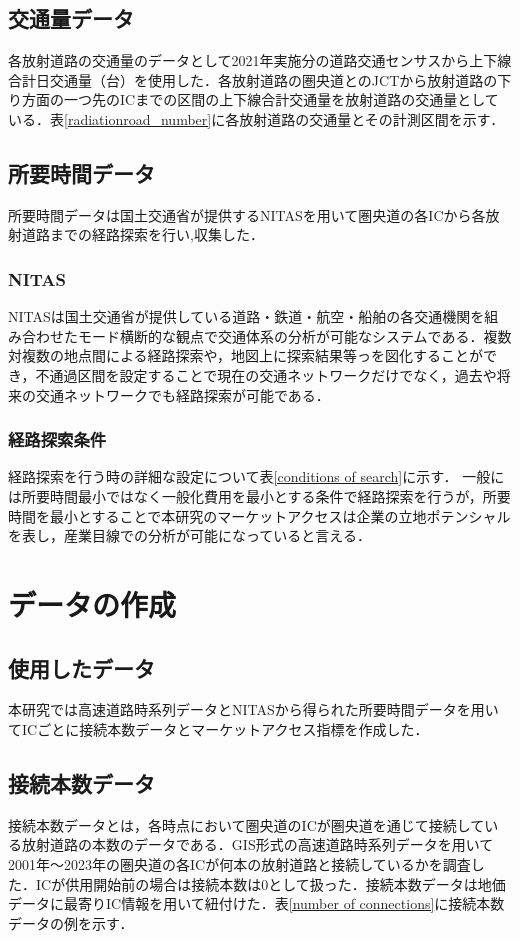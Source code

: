 \subsection{交通量データ}
各放射道路の交通量のデータとして2021年実施分の道路交通センサスから上下線合計日交通量（台）を使用した．各放射道路の圏央道とのJCTから放射道路の下り方面の一つ先のICまでの区間の上下線合計交通量を放射道路の交通量としている．表\ref{radiationroad_number}に各放射道路の交通量とその計測区間を示す．


\subsection{所要時間データ}
所要時間データは国土交通省が提供するNITASを用いて圏央道の各ICから各放射道路までの経路探索を行い,収集した．

\subsubsection{NITAS}
NITASは国土交通省が提供している道路・鉄道・航空・船舶の各交通機関を組み合わせたモード横断的な観点で交通体系の分析が可能なシステムである．複数対複数の地点間による経路探索や，地図上に探索結果等っを図化することができ，不通過区間を設定することで現在の交通ネットワークだけでなく，過去や将来の交通ネットワークでも経路探索が可能である．\cite{NITAS}

\subsubsection{経路探索条件}
経路探索を行う時の詳細な設定について表\ref{conditions of search}に示す．
一般には所要時間最小ではなく一般化費用を最小とする条件で経路探索を行うが，所要時間を最小とすることで本研究のマーケットアクセスは企業の立地ポテンシャルを表し，産業目線での分析が可能になっていると言える．


\section{データの作成}
\subsection{使用したデータ}
本研究では高速道路時系列データとNITASから得られた所要時間データを用いてICごとに接続本数データとマーケットアクセス指標を作成した．

\subsection{接続本数データ}
接続本数データとは，各時点において圏央道のICが圏央道を通じて接続している放射道路の本数のデータである．GIS形式の高速道路時系列データを用いて2001年〜2023年の圏央道の各ICが何本の放射道路と接続しているかを調査した．ICが供用開始前の場合は接続本数は0として扱った．接続本数データは地価データに最寄りIC情報を用いて紐付けた．表\ref{number of connections}に接続本数データの例を示す．


